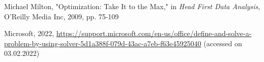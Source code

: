 \documentclass{article}
\begin{document}
\begin{multicols}{2}
\begin{thebibliography}{2}
  Michael Milton, "Optimization: Take It to the Max," in  \textit{Head First Data Analysis}, O'Reilly Media Inc, 2009, pp. 75-109
 
  Microsoft, 2022, \url{https://support.microsoft.com/en-us/office/define-and-solve-a-problem-by-using-solver-5d1a388f-079d-43ac-a7eb-f63e45925040} (accessed on 03.02.2022)

\end{thebibliography}


\end{multicols}
\end{document}
